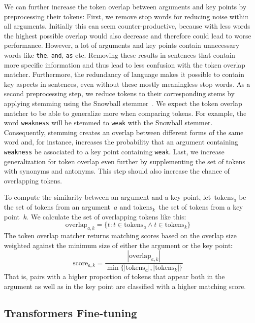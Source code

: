 We can further increase the token overlap between arguments and key points by preprocessing their tokens:
First, we remove stop words for reducing noise within all arguments.
Initially this can seem counter-productive, because with less words the highest possible overlap would also decrease and therefore could lead to worse performance.
However, a lot of arguments and key points contain unnecessary words like \texttt{the}, \texttt{and}, \texttt{as} etc.
Removing these results in sentences that contain more specific information and thus lead to less confusion with the token overlap matcher.
Furthermore, the redundancy of language makes it possible to contain key aspects in sentences, even without these mostly meaningless stop words.
As a second preprocessing step, we reduce tokens to their corresponding stems by applying stemming using the Snowball stemmer~\cite{Porter1980}. 
We expect the token overlap matcher to be able to generalize more when comparing tokens.
For example, the word \texttt{weakness} will be stemmed to \texttt{weak} with the Snowball stemmer. 
Consequently, stemming creates an overlap between different forms of the same word and, for instance, increases the probability that an argument containing \texttt{weakness} be associated to a key point containing \texttt{weak}.
Last, we increase generalization for token overlap even further by supplementing the set of tokens with synonyms and antonyms. This step should also increase the chance of overlapping tokens.

To compute the similarity between an argument and a key point, let~\(\text{tokens}_a\) be the set of tokens from an argument~\(a\) and \(\text{tokens}_k\)~the set of tokens from a key point~\(k\).
We calculate the set of overlapping tokens like this:
\begin{equation}
    \text{overlap}_{a,k} = \{ t : t \in \text{tokens}_a \land t \in \text{tokens}_k \}
\end{equation}
The token overlap matcher returns matching scores based on the overlap size weighted against the minimum size of either the argument or the key point:
\begin{equation}
    \text{score}_{a,k} = \frac{ |\text{overlap}_{a,k}| }{ \min\{ |\text{tokens}_a|, |\text{tokens}_k| \} }
\end{equation}
That is, pairs with a higher proportion of tokens that appear both in the argument as well as in the key point are classified with a higher matching score.

\subsection{Transformers Fine-tuning}

